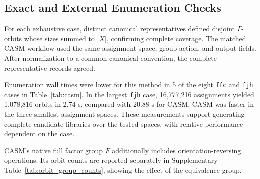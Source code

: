 \documentclass[a5paper, 10pt]{article}
\begin{document}
\subsection{Exact and External Enumeration Checks}

For each exhaustive case, distinct canonical representatives defined disjoint $\Gamma$-orbits whose sizes summed to $|X|$, confirming complete coverage. The matched CASM workflow used the same assignment space, group action, and output fields. After normalization to a common canonical convention, the complete representative records agreed.

Enumeration wall times were lower for this method in 5 of the eight \texttt{ffc} and \texttt{fjh} cases in Table~\ref{tab:casm}. In the largest \texttt{fjh} case, 16,777,216 assignments yielded 1,078,816 orbits in 2.74 s, compared with 20.88 s for CASM. CASM was faster in the three smallest assignment spaces. These measurements support generating complete candidate libraries over the tested spaces, with relative performance dependent on the case.

CASM's native full factor group $F$ additionally includes orientation-reversing operations. Its orbit counts are reported separately in Supplementary Table~\ref{tab:orbit_group_counts}, showing the effect of the equivalence group.
\end{document}
